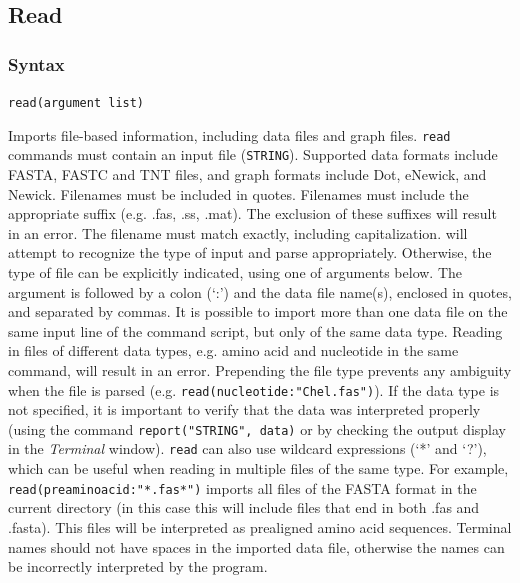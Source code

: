 	
\subsection{Read}
\label{subsec:read}
	\subsubsection{Syntax}
		\texttt{read(argument list)}
			
	\begin{phygdescription}
		{Imports file-based information, including data files and graph files. \texttt{read} 
		commands must contain an input file (\texttt{STRING}). Supported data formats 
		include FASTA, FASTC and TNT files, and graph formats include Dot, eNewick, %
		and Newick. Filenames must be included in quotes. Filenames must include the 
		appropriate suffix (e.g. .fas, .ss, .mat). The exclusion of these suffixes will result 
		in an error. The filename must match exactly, including capitalization. \phyg will 
		attempt to recognize the type of input and parse appropriately. Otherwise, the 
		type of file can be explicitly indicated, using one of arguments below. The argument 
		is followed by a colon (`:') and the data file name(s), enclosed in quotes, and 
		separated by commas. It is possible to import more than one data file on the 
		same input line of the command script, but only of the same data type. Reading 
		in files of different data types, e.g. amino acid and nucleotide in the same command, 
		will result in an error. Prepending the file type prevents any ambiguity when the file 
		is parsed (e.g. \texttt{read(nucleotide:"Chel.fas")}). If the data type is not specified, 
		it is important to verify that the data was interpreted properly (using the command 
		\texttt{report("STRING", data)} or by checking the output display in the 
		\textit{Terminal} window). \texttt{read} can also use wildcard expressions 
		(`*' and `?'), which can be useful when reading in multiple files of the 
		same type. For example, \texttt{read(preaminoacid:"*.fas*")} imports all files of the 
		FASTA format in the current directory (in this case this will include files that end 
		in both .fas and .fasta). This files will be interpreted as prealigned amino acid
		sequences. Terminal names should not have spaces in the imported 
		data file, otherwise the names can be incorrectly interpreted by the program.} 
	\end{phygdescription}

